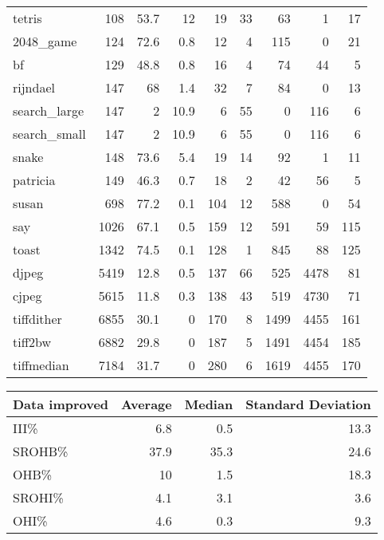 \begin{tabular}{lrrrrrrrr}
 tetris          &      108 &     53.7 &   12   &   19 &   33 &     63 &     1 &    17 \\
 2048\_game       &      124 &     72.6 &    0.8 &   12 &    4 &    115 &     0 &    21 \\
 bf              &      129 &     48.8 &    0.8 &   16 &    4 &     74 &    44 &     5 \\
 rijndael        &      147 &     68   &    1.4 &   32 &    7 &     84 &     0 &    13 \\
 search\_large    &      147 &      2   &   10.9 &    6 &   55 &      0 &   116 &     6 \\
 search\_small    &      147 &      2   &   10.9 &    6 &   55 &      0 &   116 &     6 \\
 snake           &      148 &     73.6 &    5.4 &   19 &   14 &     92 &     1 &    11 \\
 patricia        &      149 &     46.3 &    0.7 &   18 &    2 &     42 &    56 &     5 \\
 susan           &      698 &     77.2 &    0.1 &  104 &   12 &    588 &     0 &    54 \\
 say             &     1026 &     67.1 &    0.5 &  159 &   12 &    591 &    59 &   115 \\
 toast           &     1342 &     74.5 &    0.1 &  128 &    1 &    845 &    88 &   125 \\
 djpeg           &     5419 &     12.8 &    0.5 &  137 &   66 &    525 &  4478 &    81 \\
 cjpeg           &     5615 &     11.8 &    0.3 &  138 &   43 &    519 &  4730 &    71 \\
 tiffdither      &     6855 &     30.1 &    0   &  170 &    8 &   1499 &  4455 &   161 \\
 tiff2bw         &     6882 &     29.8 &    0   &  187 &    5 &   1491 &  4454 &   185 \\
 tiffmedian      &     7184 &     31.7 &    0   &  280 &    6 &   1619 &  4455 &   170 \\
\hline
\end{tabular}\begin{tabular}{lrrr}
\hline
 Data improved   &   Average &   Median &   Standard Deviation \\
\hline
 III\%            &       6.8 &      0.5 &                 13.3 \\
 SROHB\%          &      37.9 &     35.3 &                 24.6 \\
 OHB\%            &      10   &      1.5 &                 18.3 \\
 SROHI\%          &       4.1 &      3.1 &                  3.6 \\
 OHI\%            &       4.6 &      0.3 &                  9.3 \\
\hline
\end{tabular}